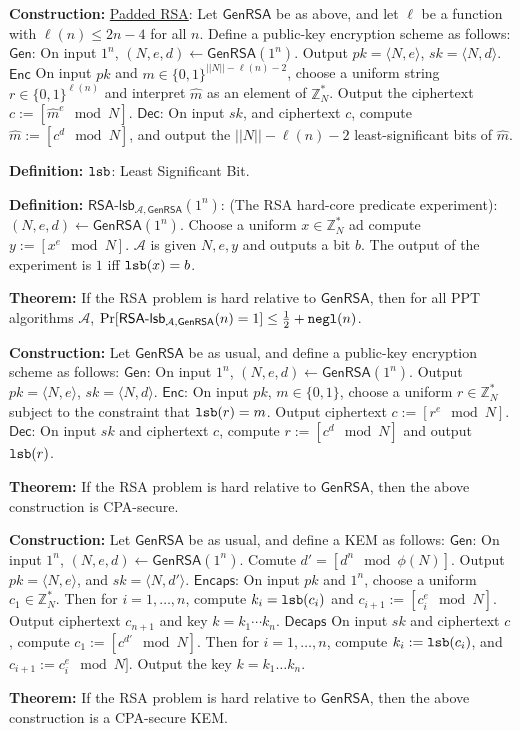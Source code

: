 \documentclass[10pt]{article}
\newcommand{\Z}{\mathbb{Z}}
\newcommand{\AAA}{\mathcal{A}}
\newcommand{\defn}[1]{{\bf Definition:} \underline{#1}}
\newcommand{\thm}[1]{{\bf Theorem:} \underline{#1}}
\newcommand{\con}[1]{{\bf Construction:} \underline{#1}}
\newcommand{\Enc}{\mathsf{Enc}}
\newcommand{\Dec}{\mathsf{Dec}}
\newcommand{\Encaps}{\mathsf{Encaps}}
\newcommand{\Decaps}{\mathsf{Decaps}}
\newcommand{\Gen}{\mathsf{Gen}}
\newcommand{\GenRSA}{\mathsf{GenRSA}}
\newcommand{\ang}[1]{\langle#1\rangle}
\newcommand{\ExptRSAHC}{\mathsf{RSA\text{-}lsb}_{\AAA,\GenRSA}}
\newcommand{\negl}{{\tt negl}}
\newcommand{\lsb}{{\tt lsb}}
\newcommand{\from}{\leftarrow}
\begin{document}
\begin{multicols}{3}
\con{Padded RSA}: Let $\GenRSA$ be as above, and let $\ell$ be a function with $\ell(n)\leq2n-4$ for all $n$. Define a public-key encryption scheme as follows: $\Gen$: On input $1^n$, $(N,e,d)\from\GenRSA(1^n)$. Output $pk=\ang{N,e}$, $sk=\ang{N,d}$. $\Enc$ On input $pk$ and $m\in\{0,1\}^{||N||-\ell(n)-2}$, choose a uniform string $r\in\{0,1\}^{\ell(n)}$ and interpret $\hat{m}$ as an element of $\Z_N^*$. Output the ciphertext $c:=[\hat{m}^e\mod{N}]$. $\Dec$: On input $sk$, and ciphertext $c$, compute $\hat{m}:=[c^d\mod{N}]$, and output the $||N||-\ell(n)-2$ least-significant bits of $\hat{m}$.

\defn{$\lsb$}: Least Significant Bit.

\defn{$\ExptRSAHC(1^n)$}: (The RSA hard-core predicate experiment): $(N,e,d)\from\GenRSA(1^n)$. Choose a uniform $x\in\Z_N^*$ ad compute $y:=[x^e\mod{N}]$. $\AAA$ is given $N,e,y$ and outputs a bit $b$. The output of the experiment is $1$ iff $\lsb(x)=b$.

\thm{}If the RSA problem is hard relative to $\GenRSA$, then for all PPT algorithms $\AAA$, $\Pr[\ExptRSAHC(n)=1]\leq\frac{1}{2}+\negl(n)$.

\con{}Let $\GenRSA$ be as usual, and define a public-key encryption scheme as follows: $\Gen$: On input $1^n$, $(N,e,d)\from\GenRSA(1^n)$. Output $pk=\ang{N,e}$, $sk=\ang{N,d}$. $\Enc$: On input $pk$, $m\in\{0,1\}$, choose a uniform $r\in\Z_N^*$ subject to the constraint that $\lsb(r)=m$. Output ciphertext $c:=[r^e\mod{N}]$. $\Dec$: On input $sk$ and ciphertext $c$, compute $r:=[c^d\mod{N}]$ and output $\lsb(r)$.

\thm{}If the RSA problem is hard relative to $\GenRSA$, then the above construction is CPA-secure.

\con{}Let $\GenRSA$ be as usual, and define a KEM as follows: $\Gen$: On input $1^n$, $(N,e,d)\from\GenRSA(1^n)$. Comute $d'=[d^n\mod{\phi(N)}]$. Output $pk=\ang{N,e}$, and $sk=\ang{N,d'}$. $\Encaps$: On input $pk$ and $1^n$, choose a uniform $c_1\in\Z_N^*$. Then for $i=1,\dots,n$, compute $k_i=\lsb(c_i)$ and $c_{i+1}:=[c_i^e\mod{N}]$. Output ciphertext $c_{n+1}$ and key $k=k_1\cdots k_n$. $\Decaps$ On input $sk$ and ciphertext $c$, compute $c_1:=[c^{d'}\mod{N}]$. Then for $i=1,\dots,n$, compute $k_i:=\lsb(c_i)$, and $c_{i+1}:=c_i^e\mod{N}]$. Output the key $k=k_1\dots k_n$.

\thm{}If the RSA problem is hard relative to $\GenRSA$, then the above construction is a CPA-secure KEM.


\end{multicols}
\end{document}
